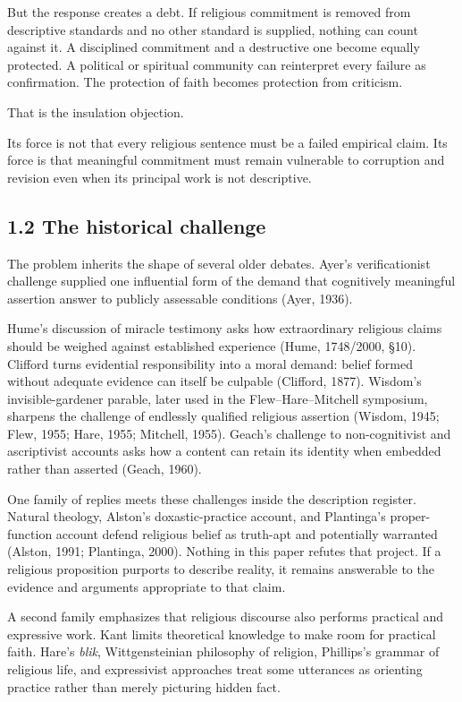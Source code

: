 \documentclass[
  11pt,
]{article}
\begin{document}
But the response creates a debt. If religious commitment is removed from
descriptive standards and no other standard is supplied, nothing can
count against it. A disciplined commitment and a destructive one become
equally protected. A political or spiritual community can reinterpret
every failure as confirmation. The protection of faith becomes
protection from criticism.

That is the insulation objection.

Its force is not that every religious sentence must be a failed
empirical claim. Its force is that meaningful commitment must remain
vulnerable to corruption and revision even when its principal work is
not descriptive.

\subsection{1.2 The historical
challenge}\label{the-historical-challenge}

The problem inherits the shape of several older debates. Ayer's
verificationist challenge supplied one influential form of the demand
that cognitively meaningful assertion answer to publicly assessable
conditions (Ayer, 1936).

Hume's discussion of miracle testimony asks how extraordinary religious
claims should be weighed against established experience (Hume,
1748/2000, §10). Clifford turns evidential responsibility into a moral
demand: belief formed without adequate evidence can itself be culpable
(Clifford, 1877). Wisdom's invisible-gardener parable, later used in the
Flew--Hare--Mitchell symposium, sharpens the challenge of endlessly
qualified religious assertion (Wisdom, 1945; Flew, 1955; Hare, 1955;
Mitchell, 1955). Geach's challenge to non-cognitivist and ascriptivist
accounts asks how a content can retain its identity when embedded rather
than asserted (Geach, 1960).

One family of replies meets these challenges inside the description
register. Natural theology, Alston's doxastic-practice account, and
Plantinga's proper-function account defend religious belief as truth-apt
and potentially warranted (Alston, 1991; Plantinga, 2000). Nothing in
this paper refutes that project. If a religious proposition purports to
describe reality, it remains answerable to the evidence and arguments
appropriate to that claim.

A second family emphasizes that religious discourse also performs
practical and expressive work. Kant limits theoretical knowledge to make
room for practical faith. Hare's \emph{blik}, Wittgensteinian philosophy
of religion, Phillips's grammar of religious life, and expressivist
approaches treat some utterances as orienting practice rather than
merely picturing hidden fact.
\end{document}
